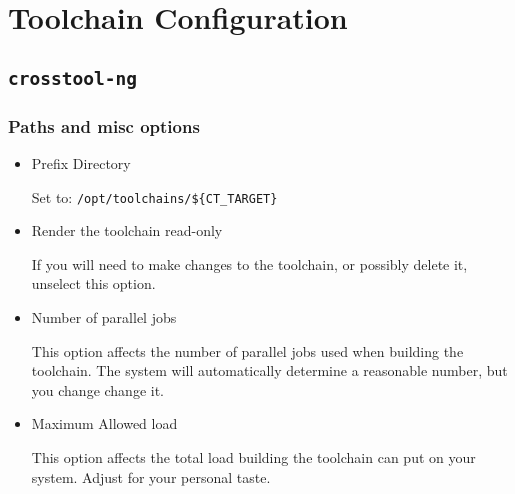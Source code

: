 %
%
%
%
\chapter{Toolchain Configuration}

\section{\texttt{crosstool-ng}}

\subsection{Paths and misc options}
\begin{itemize}
\item{Prefix Directory}

  Set to: \texttt{/opt/toolchains/\$\{CT\_TARGET\}}

\item{Render the toolchain read-only}

  If you will need to make changes to the toolchain, or possibly
  delete it, unselect this option.

\item{Number of parallel jobs}

  This option affects the number of parallel jobs used when building
  the toolchain.  The system will automatically determine a reasonable
  number, but you change change it.

\item{Maximum Allowed load}

  This option affects the total load building the toolchain can put on
  your system.  Adjust for your personal taste.
\end{itemize}

